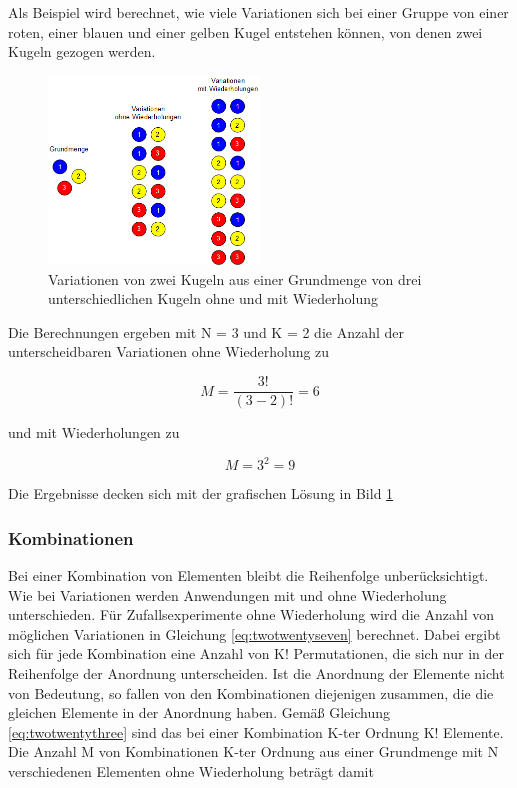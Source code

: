 \noindent Als Beispiel wird berechnet, wie viele Variationen sich bei einer Gruppe von einer roten, einer blauen und einer gelben Kugel entstehen k\"{o}nnen, von denen zwei Kugeln gezogen werden.

\noindent 
\begin{figure}[H]
  \centerline{\includegraphics[width=0.5\textwidth]{Kapitel2/Bilder/image4}}
  \caption{Variationen von zwei Kugeln aus einer Grundmenge von drei unterschiedlichen Kugeln ohne und mit Wiederholung}
  \label{fig:Variationen}
\end{figure}

\noindent Die Berechnungen ergeben mit N = 3 und K = 2 die Anzahl der unterscheidbaren Variationen ohne Wiederholung zu

\begin{equation}\label{eq:twotwentynine}
M=\dfrac{3!}{(3-2)!} =6
\end{equation}

\noindent und mit Wiederholungen zu

\begin{equation}\label{eq:twothirty}
M=3^{2} =9
\end{equation}

\noindent Die Ergebnisse decken sich mit der grafischen L\"{o}sung in Bild \ref{fig:Variationen}

\subsubsection{Kombinationen}

\noindent Bei einer Kombination von Elementen bleibt die Reihenfolge unber\"{u}cksichtigt. Wie bei Variationen werden Anwendungen mit und ohne Wiederholung unterschieden. F\"{u}r Zufallsexperimente ohne Wiederholung wird die Anzahl von m\"{o}glichen Variationen in Gleichung \eqref{eq:twotwentyseven} berechnet. Dabei ergibt sich f\"{u}r jede Kombination eine Anzahl von K! Permutationen, die sich nur in der Reihenfolge der Anordnung unterscheiden. Ist die Anordnung der Elemente nicht von Bedeutung, so fallen von den Kombinationen diejenigen zusammen, die die gleichen Elemente in der Anordnung haben. Gem\"{a}{\ss} Gleichung \eqref{eq:twotwentythree} sind das bei einer Kombination K-ter Ordnung K! Elemente. Die Anzahl M von Kombinationen K-ter Ordnung aus einer Grundmenge mit N verschiedenen Elementen ohne Wiederholung betr\"{a}gt damit 

